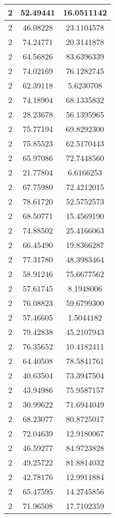 \documentclass[
]{book}
\begin{document}
\begin{tabular}{c|c|c}
\hline
2 & 52.49441 & 16.0511142\\
\hline
2 & 46.08228 & 23.1104578\\
\hline
2 & 74.24771 & 20.3141878\\
\hline
2 & 64.56826 & 83.6396339\\
\hline
2 & 74.02169 & 76.1282745\\
\hline
2 & 62.39118 & 5.6230708\\
\hline
2 & 74.18904 & 68.1335832\\
\hline
2 & 28.23678 & 56.1395965\\
\hline
2 & 75.77194 & 69.8292300\\
\hline
2 & 75.85523 & 62.5170443\\
\hline
2 & 65.97086 & 72.7448560\\
\hline
2 & 21.77804 & 6.6166253\\
\hline
2 & 67.75980 & 72.4212015\\
\hline
2 & 78.61720 & 52.5752573\\
\hline
2 & 68.50771 & 15.4569190\\
\hline
2 & 74.88502 & 25.4166063\\
\hline
2 & 66.45490 & 19.8366287\\
\hline
2 & 77.31780 & 48.3983464\\
\hline
2 & 58.91246 & 75.6677562\\
\hline
2 & 57.61745 & 8.1948006\\
\hline
2 & 76.08823 & 59.6799300\\
\hline
2 & 57.46605 & 1.5044182\\
\hline
2 & 79.42838 & 45.2107943\\
\hline
2 & 76.35652 & 10.4182411\\
\hline
2 & 64.40508 & 78.5841761\\
\hline
2 & 40.63504 & 73.3947504\\
\hline
2 & 43.94986 & 75.9587157\\
\hline
2 & 30.99622 & 71.6944049\\
\hline
2 & 68.23077 & 80.8725017\\
\hline
2 & 72.04639 & 12.9180067\\
\hline
2 & 46.59277 & 84.9723828\\
\hline
2 & 49.25722 & 81.8814032\\
\hline
2 & 42.78176 & 12.9911884\\
\hline
2 & 65.47595 & 14.2745856\\
\hline
2 & 71.96508 & 17.7102359\\

\end{tabular}
\end{document}
